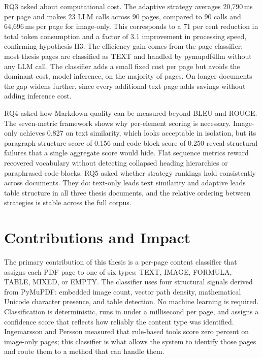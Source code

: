 RQ3 asked about computational cost. The adaptive strategy averages 20{,}790\,ms
per page and makes 23 LLM calls across 90 pages, compared to 90 calls and
64{,}696\,ms per page for image-only. This corresponds to a 71 per cent reduction
in total token consumption and a factor of 3.1 improvement in processing speed,
confirming hypothesis H3. The efficiency gain comes from the page classifier:
most thesis pages are classified as TEXT and handled by pymupdf4llm without any
LLM call. The classifier adds a small fixed cost per page but avoids the dominant
cost, model inference, on the majority of pages. On longer documents the gap
widens further, since every additional text page adds savings without adding
inference cost.

RQ4 asked how Markdown quality can be measured beyond BLEU and ROUGE. The
seven-metric framework shows why per-element scoring is necessary. Image-only
achieves 0.827 on text similarity, which looks acceptable in isolation, but its
paragraph structure score of 0.156 and code block score of 0.250 reveal
structural failures that a single aggregate score would hide. Flat sequence metrics reward
recovered vocabulary without detecting collapsed heading hierarchies or paraphrased
code blocks. RQ5 asked whether strategy rankings hold consistently across
documents. They do: text-only leads text similarity and adaptive leads table
structure in all three thesis documents, and the relative ordering between
strategies is stable across the full corpus.

\section{Contributions and Impact}

The primary contribution of this thesis is a per-page content classifier that
assigns each PDF page to one of six types: TEXT, IMAGE, FORMULA, TABLE, MIXED,
or EMPTY. The classifier uses four structural signals derived from PyMuPDF:
embedded image count, vector path density, mathematical Unicode character
presence, and table detection. No machine learning is required. Classification is
deterministic, runs in under a millisecond per page, and assigns a confidence
score that reflects how reliably the content type was identified. Ingemarsson and
Persson \autocite{ingemarsson2024} measured that rule-based tools score zero
percent on image-only pages; this classifier is what allows the system to identify
those pages and route them to a method that can handle them.

